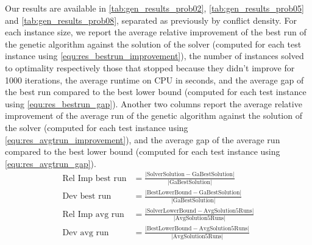 \documentclass{mimosis}
\begin{document}
Our results are available in \cref{tab:gen_results_prob02}, \cref{tab:gen_results_prob05} and \cref{tab:gen_results_prob08}, separated as previously by conflict density. For each instance size, we report the average relative improvement of the best run of the genetic algorithm against the solution of the solver (computed for each test instance using \cref{equ:res_bestrun_improvement}), the number of instances solved to optimality respectively those that stopped because they didn't improve for 1000 iterations, the average runtime on CPU in seconds, and the average gap of the best run compared to the best lower bound (computed for each test instance using \cref{equ:res_bestrun_gap}). Another two columns report the average relative improvement of the average run of the genetic algorithm against the solution of the solver (computed for each test instance using \cref{equ:res_avgtrun_improvement}), and the average gap of the average run compared to the best lower bound (computed for each test instance using \cref{equ:res_avgtrun_gap}).
\begin{align}
\text{Rel Imp best run} &= \frac{\lvert\text{SolverSolution} - \text{GaBestSolution}\rvert}{\lvert\text{GaBestSolution}\rvert} 
\label{equ:res_bestrun_improvement} \\
\text{Dev best run} &= \frac{\lvert\text{BestLowerBound} - \text{GaBestSolution}\rvert}{\lvert\text{GaBestSolution}\rvert} 
\label{equ:res_bestrun_gap} \\
\text{Rel Imp avg run} &= \frac{\lvert\text{SolverLowerBound} - \text{AvgSolution5Runs}\rvert}{\lvert\text{AvgSolution5Runs}\rvert} 
\label{equ:res_avgtrun_improvement} \\
\text{Dev avg run} &= \frac{\lvert\text{BestLowerBound} - \text{AvgSolution5Runs}\rvert}{\lvert\text{AvgSolution5Runs}\rvert} 
\label{equ:res_avgtrun_gap}
\end{align} 
\end{document}
